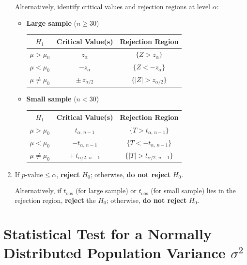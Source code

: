 \documentclass[twoside]{book}
\begin{document}
\begin{enumerate}
Alternatively, identify critical values and rejection regions at level $\alpha$:

	\begin{itemize}

		\item \textbf{Large sample} (\(n \ge 30\))
		\begin{table}[H]
			\centering
			\begin{tabular}{@{}c|c|c@{}}
				\toprule
				\textbf{$H_1$} & \textbf{Critical Value(s)} & \textbf{Rejection Region} \\
				\midrule
				$\mu > \mu_0$ & $ z_{\alpha} $ &
				\(\{Z>z_{\alpha}\}\) \\[6pt]
				$\mu < \mu_0$ &
				$ -z_{\alpha} $ &
				\(\{Z<-z_{\alpha}\}\) \\[6pt]
				$\mu \neq \mu_0$ &
				$ \pm\,z_{\alpha/2} $&
				$\{|Z| > z_{\alpha/2}\}$ \\
				\bottomrule
			\end{tabular}
		\end{table}
	\item \textbf{Small sample} (\(n < 30\))
		\begin{table}[H]
			\centering
			\begin{tabular}{@{}c|c|c@{}}
				\toprule
				\textbf{$H_1$} & \textbf{Critical Value(s)} & \textbf{Rejection Region} \\
				\midrule
				$\mu > \mu_0$ & $ t_{\alpha,\,n-1} $ & $\{T > t_{\alpha,\,n-1}\}$ \\[6pt]
				$\mu < \mu_0$ & $ -t_{\alpha,\,n-1} $ & $\{T < -t_{\alpha,\,n-1}\}$ \\[6pt]
				$\mu \neq \mu_0$ & $ \pm\,t_{\alpha/2,\,n-1} $ & $\{|T| > t_{\alpha/2,\,n-1}\}$ \\
				\bottomrule
			\end{tabular}
		\end{table}
	\end{itemize}

	\item If \(p\text{-value} \le \alpha\), \textbf{reject} \(H_0\); otherwise, \textbf{do not reject} \(H_0\).

	Alternatively, if $t_{\text{obs}}$ (for large sample) or $t_{\text{obs}}$ (for small sample) lies in the rejection region, \textbf{reject} the \(H_0\); otherwise, \textbf{do not reject} \(H_0\).
\end{enumerate}


\section{Statistical Test for a Normally Distributed Population Variance \(\sigma^2\)}
\end{document}
